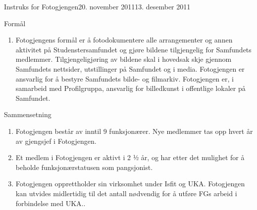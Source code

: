 \documentclass[../fsbok.tex]{subfiles}
\begin{document}
\begin{instruks}{Instruks for Fotogjengen}{20. november 2011}{13. desember 2011}

    \begin{instruksledd}{Formål}
        \begin{enumerate}
            \item Fotogjengens formål er å fotodokumentere alle arrangementer og annen aktivitet på Studenstersamfundet og gjøre bildene tilgjengelig for Samfundets medlemmer.  Tilgjengeligjøring av bildene skal i hovedsak skje gjennom Samfundets nettsider, utstillinger på Samfundet og i media. Fotogjengen er ansvarlig for å bestyre Samfundets bilde- og filmarkiv. Fotogjengen er, i samarbeid med Profilgruppa, ansvarlig for billedkunst i offentlige lokaler på Samfundet. 
        \end{enumerate}
    \end{instruksledd}
    
    \begin{instruksledd}{Sammensetning}
        \begin{enumerate} 
            \item Fotogjengen består av inntil 9 funksjonærer. Nye medlemmer tas opp hvert år av
                gjengsjef i Fotogjengen.
            \item Et medlem i Fotogjengen er aktivt i 2 ½ år, og har etter det mulighet for å beholde
                funksjonærstatusen som pangsjonist.
            \item Fotogjengen opprettholder sin virksomhet under Isfit og UKA. Fotogjengen kan utvides
                midlertidig til det antall nødvendig for å utføre FGs arbeid i forbindelse med UKA..
        \end{enumerate}
    \end{instruksledd}


\end{instruks}
\end{document}
